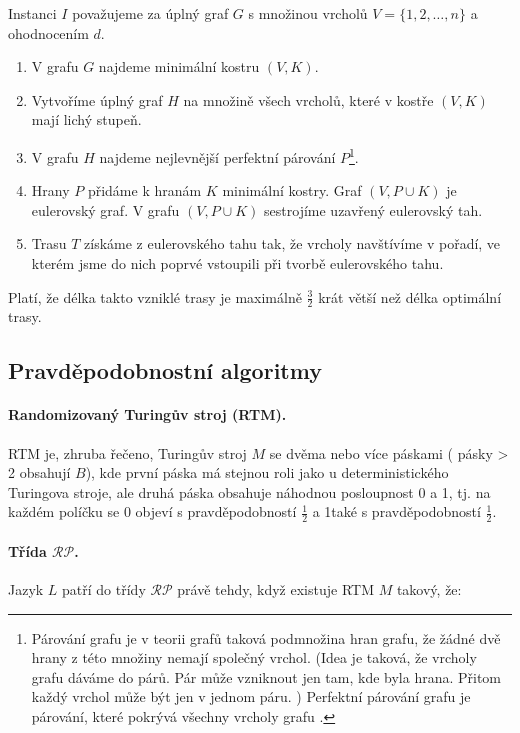 Instanci $I$ považujeme za úplný graf $G$ s množinou vrcholů $V = \{1, 2, \hdots , n\}$ a ohodnocením $d$.

\begin{enumerate}[itemsep=0pt]
    \item V grafu $G$ najdeme minimální kostru $(V,K)$.    \item Vytvoříme úplný graf $H$ na množině všech vrcholů, které v kostře $(V,K)$ mají lichý stupeň.    \item V grafu $H$ najdeme nejlevnější perfektní párování $P$\footnote{Párování grafu je v teorii grafů taková podmnožina hran grafu, že žádné dvě hrany z této množiny nemají společný vrchol. (Idea je taková, že vrcholy grafu dáváme do párů. Pár může vzniknout jen tam, kde byla hrana. Přitom každý vrchol může být jen v jednom páru. ) Perfektní párování grafu je párování, které pokrývá všechny vrcholy grafu \cite{wiki:parovani}.}.    \item Hrany $P$ přidáme k hranám $K$ minimální kostry. Graf $(V,P \cup K)$ je eulerovský graf. V grafu $(V, P \cup K)$ sestrojíme uzavřený eulerovský tah.    \item Trasu $T$ získáme z eulerovského tahu tak, že vrcholy navštívíme v pořadí, ve kterém jsme do nich poprvé vstoupili při tvorbě eulerovského tahu.
\end{enumerate}
\noindent Platí, že délka takto vzniklé trasy je maximálně $\frac{3}{2}$ krát větší než délka optimální trasy.

\subsection{Pravděpodobnostní algoritmy}

\paragraph{Randomizovaný Turingův stroj (RTM).} RTM je, zhruba řečeno, Turingův stroj $M$ se dvěma nebo více páskami ( pásky > 2 obsahují $B$), kde první páska má stejnou roli jako u deterministického Turingova stroje, ale druhá páska obsahuje náhodnou posloupnost 0 a 1, tj. na každém políčku se 0 objeví s pravděpodobností $\frac{1}{2}$ a 1také s pravděpodobností $\frac{1}{2}$.

\paragraph{Třída $\mathcal{RP}$.} Jazyk $L$ patří do třídy $\mathcal{RP}$ právě tehdy, když existuje RTM $M$ takový, že:

